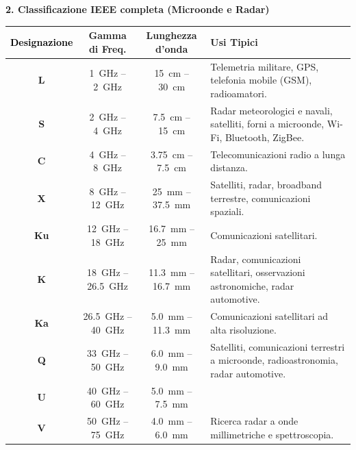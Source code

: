 \documentclass[openany,a4paper,12pt]{book}
\begin{document}
\textbf{2. Classificazione IEEE completa (Microonde e Radar)}
\begin{table}[H]
    \centering
    \footnotesize
    \renewcommand{\arraystretch}{1.3}
    \begin{tabularx}{\textwidth}{>{\bfseries\color{PoliBlue}}c c c >{\raggedright\arraybackslash}X}
        \toprule
        \rowcolor{PoliBlue!10} 
        \textcolor{black}{Designazione} & \textbf{Gamma di Freq.} & \textbf{Lunghezza d'onda} & \textbf{Usi Tipici} \\
        \midrule
        L & \qty{1}{\giga\hertz} -- \qty{2}{\giga\hertz} & \qty{15}{\centi\meter} -- \qty{30}{\centi\meter} & Telemetria militare, GPS, telefonia mobile (GSM), radioamatori. \\
        S & \qty{2}{\giga\hertz} -- \qty{4}{\giga\hertz} & \qty{7.5}{\centi\meter} -- \qty{15}{\centi\meter} & Radar meteorologici e navali, satelliti, forni a microonde, Wi-Fi, Bluetooth, ZigBee. \\
        C & \qty{4}{\giga\hertz} -- \qty{8}{\giga\hertz} & \qty{3.75}{\centi\meter} -- \qty{7.5}{\centi\meter} & Telecomunicazioni radio a lunga distanza. \\
        X & \qty{8}{\giga\hertz} -- \qty{12}{\giga\hertz} & \qty{25}{\milli\meter} -- \qty{37.5}{\milli\meter} & Satelliti, radar, broadband terrestre, comunicazioni spaziali. \\
        Ku & \qty{12}{\giga\hertz} -- \qty{18}{\giga\hertz} & \qty{16.7}{\milli\meter} -- \qty{25}{\milli\meter} & Comunicazioni satellitari. \\
        K & \qty{18}{\giga\hertz} -- \qty{26.5}{\giga\hertz} & \qty{11.3}{\milli\meter} -- \qty{16.7}{\milli\meter} & Radar, comunicazioni satellitari, osservazioni astronomiche, radar automotive. \\
        Ka & \qty{26.5}{\giga\hertz} -- \qty{40}{\giga\hertz} & \qty{5.0}{\milli\meter} -- \qty{11.3}{\milli\meter} & Comunicazioni satellitari ad alta risoluzione. \\
        Q & \qty{33}{\giga\hertz} -- \qty{50}{\giga\hertz} & \qty{6.0}{\milli\meter} -- \qty{9.0}{\milli\meter} & Satelliti, comunicazioni terrestri a microonde, radioastronomia, radar automotive. \\
        U & \qty{40}{\giga\hertz} -- \qty{60}{\giga\hertz} & \qty{5.0}{\milli\meter} -- \qty{7.5}{\milli\meter} & \\
        V & \qty{50}{\giga\hertz} -- \qty{75}{\giga\hertz} & \qty{4.0}{\milli\meter} -- \qty{6.0}{\milli\meter} & Ricerca radar a onde millimetriche e spettroscopia. \\

\end{tabularx}
\end{table}
\end{document}

